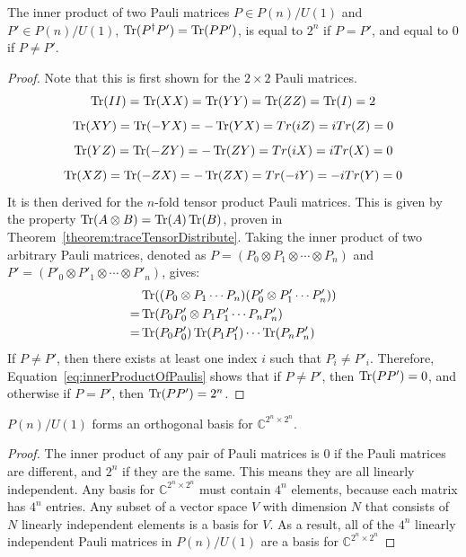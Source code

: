 \begin{theorem}
\label{theorem:innerProductPaulis}
The inner product of two Pauli matrices $P \in P(n) / U(1)$ and $P' \in P(n) / U(1)$, $\operatorname{Tr} (P^{\dagger} P') = \operatorname{Tr} (P P')$, is equal to $2^n$ if $P = P'$, and equal to $0$ if $P\neq P'$.
\end{theorem}
\begin{proof}
Note that this is first shown for the $2\times 2$ Pauli matrices.
$$
\operatorname{Tr}(II) = \operatorname{Tr}(XX) = \operatorname{Tr}(YY) = \operatorname{Tr}(ZZ) = \operatorname{Tr}(I) = 2
$$
$$
\operatorname{Tr}(XY) = \operatorname{Tr}(-YX) = -\operatorname{Tr}(YX) = Tr(iZ) = iTr(Z) = 0
$$
$$
\operatorname{Tr}(YZ) = \operatorname{Tr}(-ZY) = -\operatorname{Tr}(ZY) = Tr(iX) = iTr(X) = 0
$$
$$
\operatorname{Tr}(XZ) = \operatorname{Tr}(-ZX) = -\operatorname{Tr}(ZX) = Tr(-iY) = -iTr(Y) = 0
$$
It is then derived for the $n$-fold tensor product Pauli matrices. This is given by the property $\operatorname{Tr}(A \otimes B) = \operatorname{Tr}(A)\operatorname{Tr}(B)$, proven in Theorem~\ref{theorem:traceTensorDistribute}. Taking the inner product of two arbitrary Pauli matrices, denoted as $P = (P_0 \otimes P_1 \otimes \cdots \otimes P_n)$ and $P' = (P'_0 \otimes P'_1 \otimes \cdots \otimes P'_n)$, gives:
\begin{align}
&\operatorname{Tr}((P_0 \otimes P_1 \cdots P_n)(P'_0 \otimes P'_1 \cdots P'_n))\\
=&\operatorname{Tr}(P_0P'_0 \otimes P_1P'_1 \cdots P_nP'_n)\\
=&\operatorname{Tr}(P_0P'_0)\operatorname{Tr}(P_1P'_1) \cdots \operatorname{Tr}(P_nP'_n) \label{eq:innerProductOfPaulis}
\end{align}
If $P \neq P'$, then there exists at least one index $i$ such that $P_i \neq P'_i$. Therefore, Equation~\eqref{eq:innerProductOfPaulis} shows that if $P \neq P'$, then $\operatorname{Tr}(PP') = 0$, and otherwise if $P = P'$, then $\operatorname{Tr}(PP') = 2^n$.
\end{proof}

\begin{corollary}
\label{corollary:paulisFormBasis}
$P(n) / U(1)$ forms an orthogonal basis for $\mathbb{C}^{2^n \times 2^n}$.
\end{corollary}
\begin{proof}
The inner product of any pair of Pauli matrices is $0$ if the Pauli matrices are different, and $2^n$ if they are the same. This means they are all linearly independent. Any basis for $\mathbb{C}^{2^n \times 2^n}$ must contain $4^{n}$ elements, because each matrix has $4^n$ entries. Any subset of a vector space $V$ with dimension $N$ that consists of $N$ linearly independent elements is a basis for $V$. As a result, all of the $4^{n}$ linearly independent Pauli matrices in $P(n) / U(1)$ are a basis for $\mathbb{C}^{2^n \times 2^n}$ 
\end{proof}

